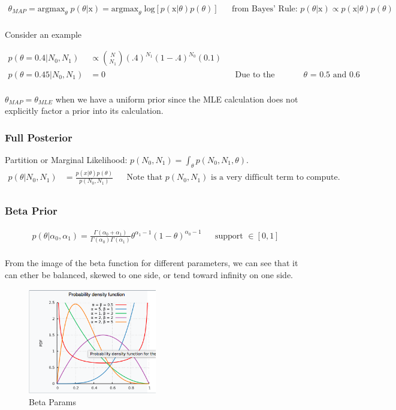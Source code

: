 \documentclass{article}
\begin{document}
\begin{align*}
\theta_{MAP} = \textrm{argmax}_{\theta} \; p(\theta | \text{x}) = \textrm{argmax}_{\theta}  \;\textrm{log}\left[p(\text{x} | \theta) p(\theta)\right] && \text{from Bayes' Rule:  $p(\theta | \text{x}) \propto p(\text{x} | \theta) p(\theta)$} \\
\end{align*}

\noindent Consider an example 

\begin{align*}
p(\theta=0.4|N_0,N_1) &\propto {N \choose N_1} (.4)^{N_1}(1-.4)^{N_0} (0.1) \\
p(\theta=0.45|N_0,N_1) &= 0 && \text{Due to the sparsity of the prior - similar result for $\theta$ = 0.5 and 0.6} \\
\end{align*}


\noindent $\theta_{MAP} = \theta_{MLE}$ when we have a uniform prior since the MLE calculation does not explicitly factor a prior into its calculation.

\subsubsection*{Full Posterior}

Partition or Marginal Likelihood: $p(N_0,N_1) = \int_\theta p(N_0,N_1,\theta)$. 
\begin{align*}
p(\theta|N_0,N_1) &= \frac{p(x|\theta) p(\theta)}{p(N_0,N_1)} && \text{Note that $p(N_0,N_1)$ is a very difficult term to compute.}\\
\end{align*}

\subsubsection*{Beta Prior}

\begin{align*}
p(\theta|\alpha_0,\alpha_1) = \frac{\Gamma(\alpha_0 + \alpha_1)}{\Gamma(\alpha_0)\Gamma(\alpha_1)} \theta^{\alpha_1-1} (1-\theta)^{\alpha_0-1}  && \text{support $\in [0,1]$} \\
\end{align*}

\noindent From the image of the beta function for different parameters, we can see that it can ether be balanced, skewed to one side, or tend toward infinity on one side. \\
\begin{figure}
\centering
\includegraphics[width=0.5\textwidth]{./beta.png}
\caption{Beta Params}
\end{figure}
\end{document}
